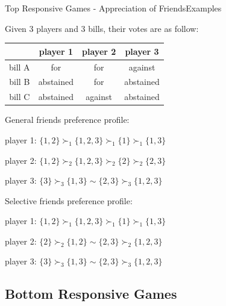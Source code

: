 \documentclass[xcolor=dvipsnames]{beamer}
\begin{document}
\begin{frame}{Top Responsive Games - Appreciation of Friends}{Examples}

\begin{example}
\label{example:votes_friends}
  \small
  Given 3 players and 3 bills, their votes are as follow:

  \begin{table}[ht]
  \centering
  \begin{tabular}{|c|c|c|c|}
  \hline
         & player 1  & player 2 & player 3 \\ \hline
  bill A & for       & for      & against \\
  bill B & abstained & for      & abstained \\
  bill C & abstained & against  & abstained \\
  \hline
  \end{tabular}
  \end{table}

\end{example}

\small
\alert{General friends} preference profile:

player 1: $\{1, 2\} \succ_1 \{1, 2, 3\} \succ_1 \{1\} \succ_1 \{1, 3\} $

player 2: $\{1, 2\} \succ_2 \{1, 2, 3\} \succ_2 \{2\} \succ_2 \{2, 3\}$

player 3: $\{3\} \succ_3 \{1, 3\} \sim \{2, 3\} \succ_3 \{1, 2, 3\}$

\alert{Selective friends} preference profile:

player 1: $\{1, 2\} \succ_1 \{1, 2, 3\} \succ_1 \{1\} \succ_1 \{1, 3\} $

player 2: $\{2\} \succ_2 \{1, 2\} \sim \{2, 3\} \succ_2 \{1, 2, 3\} $

player 3: $\{3\} \succ_3 \{1, 3\} \sim \{2, 3\} \succ_3 \{1, 2, 3\}$


\end{frame}


\subsection{Bottom Responsive Games}
\end{document}
